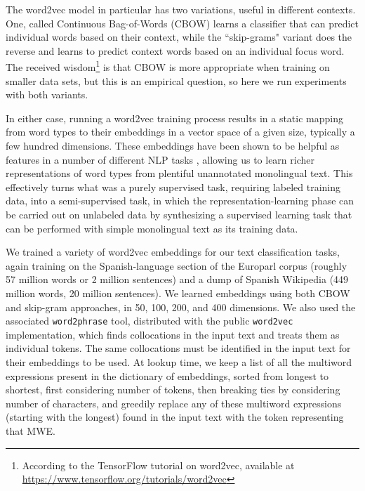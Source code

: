 The word2vec model in particular has two variations, useful in different
contexts. One, called Continuous Bag-of-Words (CBOW) learns a classifier that
can predict individual words based on their context, while the ``skip-grams"
variant does the reverse and learns to predict context words based on an
individual focus word. The received wisdom\footnote{According to the TensorFlow
tutorial on word2vec, available at
\url{https://www.tensorflow.org/tutorials/word2vec}} is that CBOW is more
appropriate when training on smaller data sets, but this is an empirical
question, so here we run experiments with both variants.

In either case, running a word2vec training process results in a static mapping
from word types to their embeddings in a vector space of a given size,
typically a few hundred dimensions. These embeddings have been shown to be
helpful as features in a number of different NLP tasks \cite{baroni2014don},
allowing us to learn richer representations of word types from plentiful
unannotated monolingual text. This effectively turns what was a purely
supervised task, requiring labeled training data, into a semi-supervised task,
in which the representation-learning phase can be carried out on unlabeled data
by synthesizing a supervised learning task that can be performed with simple
monolingual text as its training data.

We trained a variety of word2vec embeddings for our text classification tasks,
again training on the Spanish-language section of the Europarl corpus (roughly
57 million words or 2 million sentences) and a dump of Spanish Wikipedia (449
million words, 20 million sentences). We learned embeddings using both CBOW and
skip-gram approaches, in 50, 100, 200, and 400 dimensions. We also
used the associated \texttt{word2phrase} tool, distributed with the public
\texttt{word2vec} implementation, which finds collocations in the input text
and treats them as individual tokens. The same collocations must be identified
in the input text for their embeddings to be used. At lookup time, we keep a
list of all the multiword expressions present in the dictionary of embeddings,
sorted from longest to shortest, first considering number of tokens, then
breaking ties by considering number of characters, and greedily replace any of
these multiword expressions (starting with the longest) found in the input text
with the token representing that MWE.

